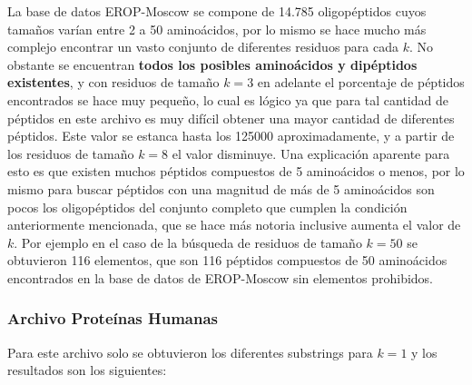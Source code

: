 La base de datos EROP-Moscow se compone de 14.785 oligopéptidos cuyos tamaños varían entre 2 a 50 aminoácidos, por lo mismo se hace mucho más complejo encontrar un vasto conjunto de diferentes residuos para cada $k$. No obstante se encuentran \textbf{todos los posibles aminoácidos y dipéptidos existentes}, y con residuos de tamaño $k=3$ en adelante el porcentaje de péptidos encontrados se hace muy pequeño, lo cual es lógico ya que para tal cantidad de péptidos en este archivo es muy difícil obtener una mayor cantidad de diferentes péptidos. Este valor se estanca hasta los 125000 aproximadamente, y a partir de los residuos de tamaño $k=8$ el valor disminuye. Una explicación aparente para esto es que existen muchos péptidos compuestos de 5 aminoácidos o menos, por lo mismo para buscar péptidos con una magnitud de más de 5 aminoácidos son pocos los oligopéptidos del conjunto completo que cumplen la condición anteriormente mencionada, que se hace más notoria inclusive aumenta el valor de $k$. Por ejemplo en el caso de la búsqueda de residuos de tamaño $k=50$ se obtuvieron 116 elementos, que son 116 péptidos compuestos de 50 aminoácidos encontrados en la base de datos de EROP-Moscow sin elementos prohibidos.

\subsubsection{Archivo Proteínas Humanas}

Para este archivo solo se obtuvieron los diferentes substrings para $k=1$ y los resultados son los siguientes:

